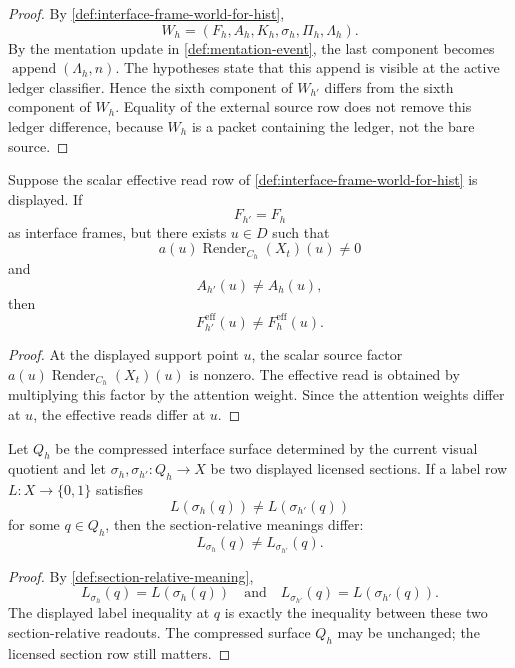 \begin{proof}
By \autoref{def:interface-frame-world-for-hist},
$$
W_h=(F_h,A_h,K_h,\sigma_h,\Pi_h,\Lambda_h).
$$
By the mentation update in \autoref{def:mentation-event}, the last
component becomes $\operatorname{append}(\Lambda_h,n)$. The hypotheses
state that this append is visible at the active ledger classifier. Hence
the sixth component of $W_{h'}$ differs from the sixth component of
$W_h$. Equality of the external source row does not remove this ledger
difference, because $W_h$ is a packet containing the ledger, not the bare
source.
\end{proof}

\begin{theorem}
\label{thm:attention-change-changes-effective-read}
Suppose the scalar effective read row of
\autoref{def:interface-frame-world-for-hist} is displayed. If
$$
F_{h'}=F_h
$$
as interface frames, but there exists $u\in D$ such that
$$
a(u)\operatorname{Render}_{C_h}(X_t)(u)\neq 0
$$
and
$$
A_{h'}(u)\neq A_h(u),
$$
then
$$
F_{h'}^{\mathrm{eff}}(u)\neq F_h^{\mathrm{eff}}(u).
$$
\end{theorem}

\begin{proof}
At the displayed support point $u$, the scalar source factor
$a(u)\operatorname{Render}_{C_h}(X_t)(u)$ is nonzero. The effective read is
obtained by multiplying this factor by the attention weight. Since the
attention weights differ at $u$, the effective reads differ at $u$.
\end{proof}

\begin{theorem}
\label{thm:section-update-changes-section-relative-meaning}
Let $Q_h$ be the compressed interface surface determined by the current
visual quotient and let $\sigma_h,\sigma_{h'}:Q_h\to X$ be two displayed
licensed sections. If a label row $L:X\to\{0,1\}$ satisfies
$$
L(\sigma_h(q))\neq L(\sigma_{h'}(q))
$$
for some $q\in Q_h$, then the section-relative meanings differ:
$$
L_{\sigma_h}(q)\neq L_{\sigma_{h'}}(q).
$$
\end{theorem}

\begin{proof}
By \autoref{def:section-relative-meaning},
$$
L_{\sigma_h}(q)=L(\sigma_h(q))
\quad\text{and}\quad
L_{\sigma_{h'}}(q)=L(\sigma_{h'}(q)).
$$
The displayed label inequality at $q$ is exactly the inequality between
these two section-relative readouts. The compressed surface $Q_h$ may be
unchanged; the licensed section row still matters.
\end{proof}

